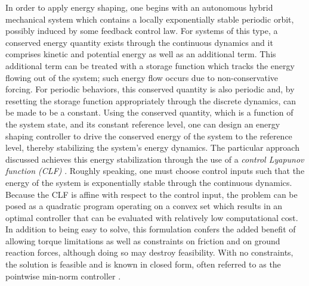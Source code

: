 \documentclass[english]{article}
\begin{document}
%
%
In order to apply energy shaping, one begins with an autonomous hybrid
mechanical system which contains a locally exponentially stable periodic orbit,
possibly induced by some feedback control law.
%
For systems of this type, a conserved energy quantity exists through the
continuous dynamics and it comprises kinetic and potential energy as well as an
additional term.
%
This additional term can be treated with a storage function which tracks the
energy flowing out of the system; such energy flow occurs due to
non-conservative forcing.
%
For periodic behaviors, this conserved quantity is also periodic and, by
resetting the storage function appropriately through the discrete dynamics, can
be made to be a constant.
%
Using the conserved quantity, which is a function of the system state, and its
constant reference level, one can design an energy shaping controller to drive
the conserved energy of the system to the reference level, thereby stabilizing
the system's energy dynamics.
%
The particular approach discussed achieves this energy stabilization through the
use of a {\em control Lyapunov function (CLF)} \cite{Freeman1996}.
%
Roughly speaking, one must choose control inputs such that the energy of the
system is exponentially stable through the continuous dynamics.
%
Because the CLF is affine with respect to the control input, the problem can be
posed as a quadratic program operating on a convex set which results in an
optimal controller that can be evaluated with relatively low computational
cost.
%
In addition to being easy to solve, this formulation confers the added benefit
of allowing torque limitations as well as constraints on friction and on ground
reaction forces, although doing so may destroy feasibility.
%
With no constraints, the solution is feasible and is known in closed form, often
referred to as the pointwise min-norm controller \cite{Freeman1996}.

% 
% 
% 
\end{document}
